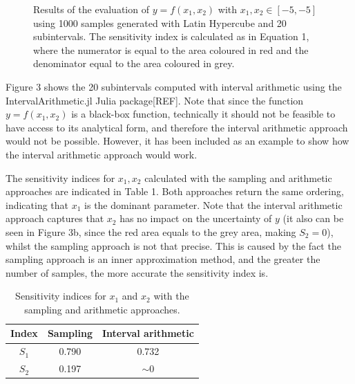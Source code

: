 \documentclass[twocolumn]{rps-esrel2022}
\begin{document}
\begin{figure}
	\caption{Results of the evaluation of $y=f(x_1,x_2)$ with $x_1,x_2 \in [-5,-5]$ using 1000 samples generated with Latin Hypercube and 20 subintervals.
	The sensitivity index is calculated as in Equation 1, where the numerator is equal to the area coloured in red and the denominator
	equal to the area coloured in grey.}
	\label{fig:myfig}
\end{figure}

Figure 3 shows the 20 subintervals computed with interval arithmetic using the IntervalArithmetic.jl Julia package[REF].
Note that since the function $y = f(x_1,x_2)$ is a black-box function, technically it should not be feasible to have access to
its analytical form, and therefore the interval arithmetic approach would not be possible.
However, it has been included as an example to show how the interval arithmetic approach would work.

The sensitivity indices for $x_1,x_2$ calculated with the sampling and arithmetic approaches are indicated in Table 1.
Both approaches return the same ordering, indicating that $x_1$ is the dominant parameter.
Note that the interval arithmetic approach captures that $x_2$ has no impact on the uncertainty of $y$ (it also can be seen in Figure 3b, since the
red area equals to the grey area, making $S_2 = 0$), whilst the sampling approach is not that precise.
This is caused by the fact the sampling approach is an inner approximation method, and the greater the number of samples,
the more accurate the sensitivity index is.

\begin{table}[!h]
	\centering
	\caption{Sensitivity indices for $x_1$ and $x_2$ with the sampling and arithmetic approaches.}
	\begin{tabular}{ccc}
	\hline
	Index & Sampling & Interval arithmetic \\ \hline
	$S_1$ & 0.790    & 0.732               \\
	$S_2$ & 0.197    & $\sim0$                   \\ \hline
	\end{tabular}%
\end{table}
\end{document}
